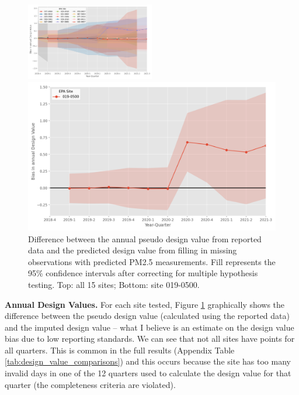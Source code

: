 \documentclass[12pt]{article}
\begin{document}
\FloatBarrier

\begin{figure}
    \centering
    \includegraphics[width=0.5\textwidth]{output/figures/final_results/DV_annual_plot_all_test_sites_conservative.png}
    \smallskip\par
    \includegraphics[width=\linewidth]{output/figures/final_results/DV_annual_plot_site_019-0500_conservative.png}
    \caption{Difference between the annual pseudo design value from reported data and the predicted design value from filling in missing observations with predicted PM2.5 measurements. Fill represents the 95\% confidence intervals after correcting for multiple hypothesis testing. Top: all 15 sites; Bottom: site 019-0500.}
    \label{fig:dv_annual}
\end{figure}

\noindent\textbf{Annual Design Values.} For each site tested, Figure \ref{fig:dv_annual} graphically shows the difference between the pseudo design value (calculated using the reported data) and the imputed design value -- what I believe is an estimate on the design value bias due to low reporting standards. We can see that not all sites have points for all quarters. This is common in the full results (Appendix Table \ref{tab:design_value_comparisons}) and this occurs because the site has too many invalid days in one of the 12 quarters used to calculate the design value for that quarter (the completeness criteria are violated). 
\end{document}
